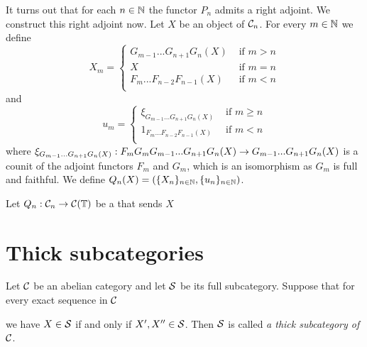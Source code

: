 It turns out that for each $n\in {\mathbb N}$ the functor $P_n$ admits a right adjoint. We construct this right adjoint now. Let $X$ be an object of ${\mathcal C}_n$. For every $m\in {\mathbb N}$ we define
$$X_m = \begin{cases} G_{m-1}...G_{n+1}G_n(X)& \mbox{ if }m > n\\
X & \mbox{ if }m=n\\
F_{m}...F_{n-2}F_{n-1}(X)& \mbox{ if }m < n\\
\end{cases}$$
and
$$u_m = \begin{cases} \xi_{G_{m-1}...G_{n+1}G_n(X)}& \mbox{ if }m \geq n\\
1_{F_{m}...F_{n-2}F_{n-1}(X)}& \mbox{ if }m < n\\
\end{cases}$$
where $\xi_{G_{m-1}...G_{n+1}G_n(X)}:F_mG_{m}G_{m-1}...G_{n+1}G_n(X)\rightarrow G_{m-1}...G_{n+1}G_n(X)$ is a counit of the adjoint functors $F_m$ and $G_m$, which is an isomorphism as $G_m$ is full and faithful. We define $Q_n(X) = \left(\{X_n\}_{n\in {\mathbb N}},\{u_n\}_{n\in {\mathbb N}}\right)$.


\begin{proposition}
Let $Q_n:{\mathcal C}_n\rightarrow {\mathcal C}(\mathbb{T})$ be a that sends $X$
\end{proposition}


\section{Thick subcategories}

\begin{definition}
Let ${\mathcal C}$ be an abelian category and let ${\mathcal S}$ be its full subcategory. Suppose that for every exact sequence in ${\mathcal C}$
\begin{center}
\end{center}
we have $X\in {\mathcal S}$ if and only if $X',X''\in {\mathcal S}$. Then ${\mathcal S}$ is called \textit{a thick subcategory of ${\mathcal C}$}.
\end{definition}

